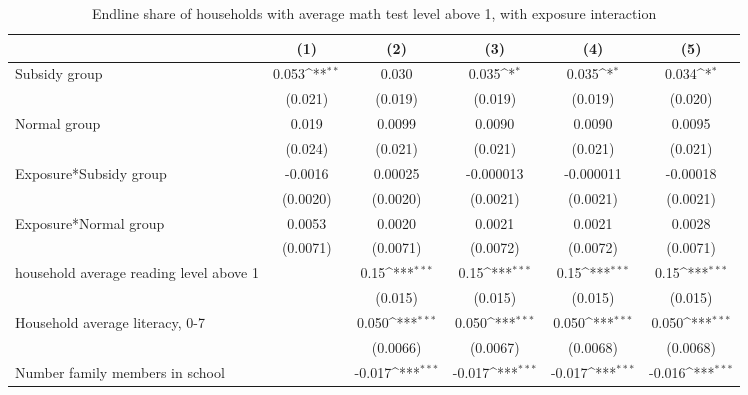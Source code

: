 \begin{table}[htbp]\centering
\def\sym#1{\ifmmode^{#1}\else\(^{#1}\)\fi}
\caption{Endline share of households with average math test level above 1, with exposure interaction}
\begin{tabular*}{1\hsize}{@{\hskip\tabcolsep\extracolsep\fill}l*{5}{c}}
\toprule
                &\multicolumn{1}{c}{(1)}         &\multicolumn{1}{c}{(2)}         &\multicolumn{1}{c}{(3)}         &\multicolumn{1}{c}{(4)}         &\multicolumn{1}{c}{(5)}         \\
\midrule
Subsidy group   &    0.053\sym{**} &    0.030         &    0.035\sym{*}  &    0.035\sym{*}  &    0.034\sym{*}  \\
                &  (0.021)         &  (0.019)         &  (0.019)         &  (0.019)         &  (0.020)         \\
Normal group    &    0.019         &   0.0099         &   0.0090         &   0.0090         &   0.0095         \\
                &  (0.024)         &  (0.021)         &  (0.021)         &  (0.021)         &  (0.021)         \\
Exposure*Subsidy group&  -0.0016         &  0.00025         &-0.000013         &-0.000011         & -0.00018         \\
                & (0.0020)         & (0.0020)         & (0.0021)         & (0.0021)         & (0.0021)         \\
Exposure*Normal group&   0.0053         &   0.0020         &   0.0021         &   0.0021         &   0.0028         \\
                & (0.0071)         & (0.0071)         & (0.0072)         & (0.0072)         & (0.0071)         \\
household average reading level above 1&                  &     0.15\sym{***}&     0.15\sym{***}&     0.15\sym{***}&     0.15\sym{***}\\
                &                  &  (0.015)         &  (0.015)         &  (0.015)         &  (0.015)         \\
Household average literacy, 0-7&                  &    0.050\sym{***}&    0.050\sym{***}&    0.050\sym{***}&    0.050\sym{***}\\
                &                  & (0.0066)         & (0.0067)         & (0.0068)         & (0.0068)         \\
Number family members in school&                  &   -0.017\sym{***}&   -0.017\sym{***}&   -0.017\sym{***}&   -0.016\sym{***}\\

\end{tabular*}
\end{table}
